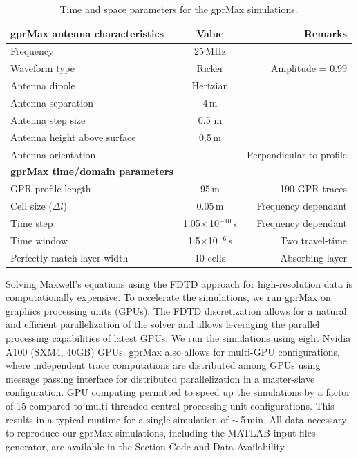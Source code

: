 \begin{table}
\centering
\caption{Time and space parameters for the gprMax simulations.}
\label{tab_domain}
\begin{tabular}{l c r}
\hline
\textbf{gprMax antenna characteristics}  & \textbf{Value} & \textbf{Remarks} \\
\hline
Frequency & 25\,MHz  \\
Waveform type & Ricker & Amplitude = 0.99\\
Antenna dipole & Hertzian &\\
Antenna separation & 4\,m & \\
Antenna step size & 0.5 m & \\
Antenna height above surface & 0.5\,m & \\
Antenna orientation & & Perpendicular to profile\\
\hline
\textbf{gprMax time/domain parameters}  &  &  \\
\hline
GPR profile length & 95\,m & 190 GPR traces \\
Cell size ($\Delta l$) & 0.05\,m & Frequency dependant\\
Time step & 1.05$\times$\,10$^{-10}$\,s & Frequency dependant \\
Time window & 1.5$\times$10$^{-6}$\,s & Two travel-time \\
Perfectly match layer width & 10 cells & Absorbing layer\\
\hline
\end{tabular}
\label{table:param_gprmax}
\end{table}

Solving Maxwell’s equations using the FDTD approach for high-resolution data is computationally expensive. To accelerate the simulations, we run gprMax on graphics processing units (GPUs). The FDTD discretization allows for a natural and efficient parallelization of the solver and allows  leveraging the parallel processing capabilities of latest GPUs. We run the simulations using eight Nvidia A100 (SXM4, 40GB) GPUs. gprMax also allows for multi-GPU configurations, where independent trace computations are distributed among GPUs using message passing interface for distributed parallelization in a master-slave configuration. GPU computing permitted to speed up the simulations by a factor of 15 compared to multi-threaded central processing unit configurations. This results in a typical runtime for a single simulation of $\sim$\,5\,min. All data necessary to reproduce our gprMax simulations, including the MATLAB input files generator, are available in the Section Code and Data Availability. 


